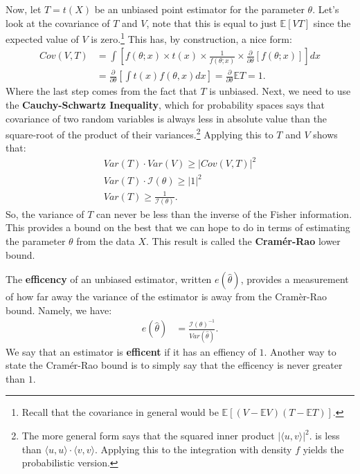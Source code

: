 \documentclass{tufte-handout}
\begin{document}
Now, let $T = t(X)$ be an unbiased point estimator for the parameter $\theta$.
Let's look at the covariance of $T$ and $V$, note that this
is equal to just $\mathbb{E}[VT]$ since the expected value of $V$ is
zero.\footnote{
  Recall that the covariance in general would be $\mathbb{E}[(V - \mathbb{E}V)(T - \mathbb{E}T)]$.
} This has, by construction, a nice form:
\begin{align*}
Cov(V, T) &= \int \left[ f(\theta; x) \times t(x) \times \frac{1}{f(\theta; x)} \times \frac{\partial}{\partial \theta} \left[ f(\theta; x) \right] \right] dx \\
&= \frac{\partial}{\partial \theta} \left[ \int t(x) f(\theta, x) dx \right] = \frac{\partial}{\partial \theta} \mathbb{E}T = 1.
\end{align*}
Where the last step comes from the fact that $T$ is unbiased.
Next, we need to use the \textbf{Cauchy-Schwartz Inequality}, which for
probability spaces says that covariance of two random variables is always
less in absolute value than the square-root of the product of their
variances.\footnote{
  The more general form says that the squared inner product $| \langle u, v\rangle |^2$.
  is less than $\langle u, u\rangle \cdot \langle v, v\rangle$. Applying this to
  the integration with density $f$ yields the probabilistic version.
} Applying this to $T$ and $V$ shows that:
\begin{align*}
Var(T) \cdot Var(V) \geq | Cov(V, T) |^2  \\
Var(T) \cdot \mathcal{I}(\theta) \geq | 1 |^2  \\
Var(T) \geq \frac{1}{\mathcal{I}(\theta)}.
\end{align*}
So, the variance of $T$ can never be less than the inverse of the Fisher
information. This provides a bound on the best that we can hope to do in terms
of estimating the parameter $\theta$ from the data $X$. This result is called the
\textbf{Cramér-Rao} lower bound.

The \textbf{efficency} of an unbiased estimator, written $e(\widehat{\theta})$, 
provides a measurement of how far away the variance of the estimator is 
away from the Cramèr-Rao bound. Namely, we have:
\begin{align*}
e(\widehat{\theta}) &= \frac{\mathcal{I}(\theta)^{-1}}{Var(\widehat{\theta})}.
\end{align*}
We say that an estimator is \textbf{efficent} if it has an effiency of $1$.
Another way to state the Cramér-Rao bound is to simply say that the efficency
is never greater than $1$.
\end{document}
